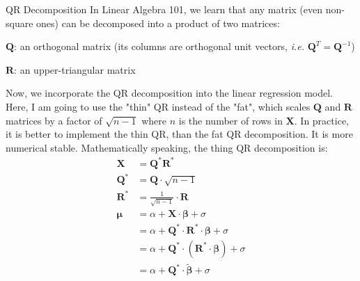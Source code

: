 \documentclass[aspectratio=169]{beamer}                    %
\begin{document}
\begin{frame}[plain, noframenumbering, label=appendixnqr]{QR Decomposition}
	\footnotesize
	In Linear Algebra 101, we learn that any matrix
	(even non-square ones) can be decomposed into a product of two matrices:
	\begin{vfilleditems}
		\footnotesize
		\item $\mathbf{Q}$: an orthogonal matrix (its columns are orthogonal unit vectors,
		\textit{i.e.} $\mathbf{Q}^T = \mathbf{Q}^{-1}$)
		\item $\mathbf{R}$: an upper-triangular matrix
	\end{vfilleditems}
	\footnotesize
	Now, we incorporate the QR decomposition into the linear regression model.
	Here, I am going to use the "thin" QR instead of the "fat", which scales $\mathbf{Q}$ and $\mathbf{R}$
	matrices by a factor of $\sqrt{n-1}$ where $n$ is the number of rows in $\mathbf{X}$.
	In practice, it is better to implement the thin QR, than the fat QR decomposition.
	It is more numerical stable. Mathematically speaking, the thing QR decomposition is:
	$$
		\begin{aligned}
			\mathbf{X}       & = \mathbf{Q}^* \mathbf{R}^*                                                    \\
			\mathbf{Q}^*     & = \mathbf{Q} \cdot \sqrt{n - 1}                                                \\
			\mathbf{R}^*     & = \frac{1}{\sqrt{n - 1}} \cdot \mathbf{R}                                      \\
			\boldsymbol{\mu} & = \alpha + \mathbf{X} \cdot \boldsymbol{\beta} + \sigma                        \\
			                 & = \alpha + \mathbf{Q}^* \cdot \mathbf{R}^* \cdot \boldsymbol{\beta} + \sigma   \\
			                 & = \alpha + \mathbf{Q}^* \cdot (\mathbf{R}^* \cdot \boldsymbol{\beta}) + \sigma \\
			                 & = \alpha + \mathbf{Q}^* \cdot \widetilde{\boldsymbol{\beta}} + \sigma
		\end{aligned}
	$$
\end{frame}
\end{document}
